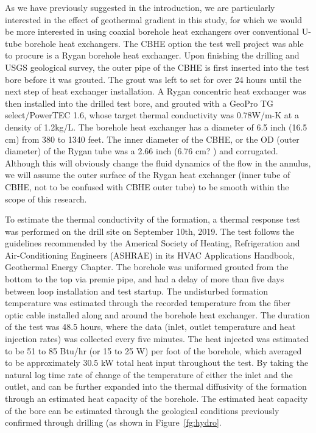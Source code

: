 	As we have previously suggested in the introduction, we are particularly interested in the effect of geothermal gradient in this study, for which we would be more interested in using coaxial borehole heat exchangers over conventional U-tube borehole heat exchangers. The CBHE option the test well project was able to procure is a Rygan borehole heat exchanger. Upon finishing the drilling and USGS geological survey, the outer pipe of the CBHE is first inserted into the test bore before it was grouted. The grout was left to set for over 24 hours until the next step of heat exchanger installation.
	A Rygan concentric heat exchanger was then installed into the drilled test bore, and grouted with a GeoPro TG select/PowerTEC 1.6, whose target thermal conductivity was 0.78W/m-K at a density of 1.2kg/L. The borehole heat exchanger has a diameter of 6.5 inch (16.5 cm) from 380 to 1340 feet. The inner diameter of the CBHE, or the OD (outer diameter) of the Rygan tube was a 2.66 inch (6.76 cm? ) and corrugated. Although this will obviously change the fluid dynamics of the flow in the annulus, we will assume the outer surface of the Rygan heat exchanger (inner tube of CBHE, not to be confused with CBHE outer tube) to be smooth within the scope of this research.


	To estimate the thermal conductivity of the formation, a thermal response test was performed on the drill site on September 10th, 2019. The test follows the guidelines recommended by the Americal Society of Heating, Refrigeration and Air-Conditioning Engineers (ASHRAE) in its HVAC Applications Handbook, Geothermal Energy Chapter. The borehole was uniformed grouted from the bottom to the top via premie pipe, and had a delay of more than five days between loop installation and test startup. The undisturbed formation temperature was estimated through the recorded temperature from the fiber optic cable installed along and around the borehole heat exchanger. The duration of the test was 48.5 hours, where the data (inlet, outlet temperature and heat injection rates) was collected every five minutes.  The heat injected was estimated to be 51 to 85 Btu/hr (or 15 to 25 W) per foot of the borehole, which averaged to be approximately 30.5 kW total heat input throughout the test. By taking the natural log time rate of change of the temperature of either the inlet and the outlet, and can be further expanded into the thermal diffusivity of the formation through an estimated heat capacity of the borehole. The estimated heat capacity of the bore can be estimated through the geological conditions previously confirmed through drilling (as shown in Figure~\ref{fg:hydro}.



